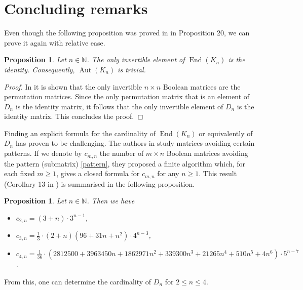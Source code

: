 \documentclass[pdflatex,sn-mathphys-num]{sn-jnl}%
\theoremstyle{thmstyleone}%
\newtheorem{proposition}[theorem]{Proposition}%
\theoremstyle{thmstyletwo}%
\theoremstyle{thmstylethree}%
\begin{document}
\section{Concluding remarks}

Even though the following proposition was proved in \cite{GK} in Proposition 20, we can prove it again with relative ease.
\begin{proposition}
   Let $n\in\mathbb{N}$. The only invertible element of $\operatorname{End}(K_n)$ is the identity. Consequently, $\operatorname{Aut}(K_n)$ is trivial.
\end{proposition}

\begin{proof}
   In \cite{Rutherford} it is shown that the only invertible $n \times n$ Boolean matrices are the permutation matrices.
   Since the only permutation matrix that is an element of $D_n$ is the identity matrix, it follows that the only invertible element of $D_n$ is the identity matrix. This concludes the proof.
\end{proof}

Finding an explicit formula for the cardinality of $\operatorname{End}(K_n)$ or equivalently of $D_n$ has proven to be challenging. The authors in \cite{Kitaev} study matrices avoiding certain patterns. If we denote by $c_{m, n}$ the number of $m \times n$ Boolean matrices avoiding the pattern (submatrix) \eqref{pattern}, they proposed a finite algorithm which, for each fixed $m \geq 1$, gives a closed formula for $c_{m, n}$ for any $n \geq 1$. This result (Corollary 13 in \cite{Kitaev}) is summarised in the following proposition.
\begin{proposition}
   Let $n \in \mathbb{N}$. Then we have
   \begin{itemize}
      \item $c_{2, n} = (3 + n) \cdot 3^{n-1}$,
      \vspace{0.2cm}
      \item $c_{3, n} = \frac{1}{3} \cdot (2 + n)(96 + 31n + n^2) \cdot 4^{n - 3}$,
      \vspace{0.2cm}
      \item $c_{4, n} = \frac{1}{36} \cdot (2812500 + 3963450n + 1862971n^2 + 339300n^3 + 21265n^4 + 510n^5 + 4n^6) \cdot 5^{n-7}$.
   \end{itemize}
\end{proposition} 
From this, one can determine the cardinality of $D_n$ for $2 \leq n \leq 4$. 
\end{document}
